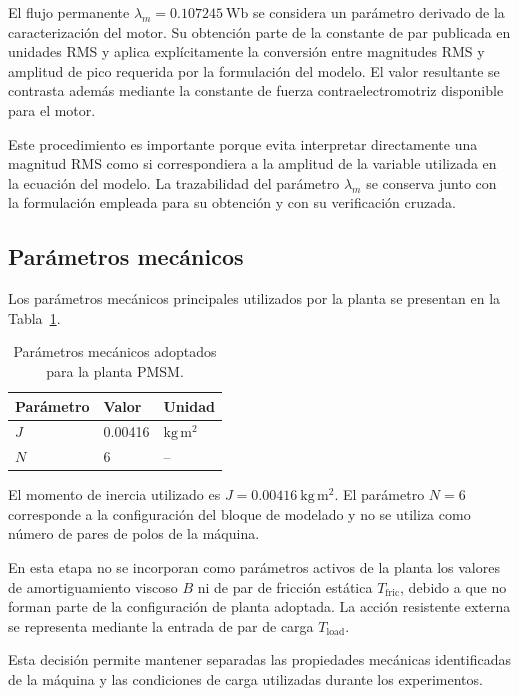 El flujo permanente $\lambda_m=0.107245~\mathrm{Wb}$ se considera un parámetro derivado de la caracterización del motor. Su obtención parte de la constante de par publicada en unidades RMS y aplica explícitamente la conversión entre magnitudes RMS y amplitud de pico requerida por la formulación del modelo. El valor resultante se contrasta además mediante la constante de fuerza contraelectromotriz disponible para el motor.

Este procedimiento es importante porque evita interpretar directamente una magnitud RMS como si correspondiera a la amplitud de la variable utilizada en la ecuación del modelo. La trazabilidad del parámetro $\lambda_m$ se conserva junto con la formulación empleada para su obtención y con su verificación cruzada.

\subsection{Parámetros mecánicos}

Los parámetros mecánicos principales utilizados por la planta se presentan en la Tabla~\ref{tab:parametros-mecanicos-m4}.

\begin{table}[H]
\centering
\caption{Parámetros mecánicos adoptados para la planta PMSM.}
\label{tab:parametros-mecanicos-m4}
\begin{tabular}{lll}
\toprule
Parámetro & Valor & Unidad \\
\midrule
$J$ & 0.00416 & $\mathrm{kg\,m^2}$ \\
$N$ & 6 & -- \\
\bottomrule
\end{tabular}
\end{table}

El momento de inercia utilizado es $J=0.00416~\mathrm{kg\,m^2}$. El parámetro $N=6$ corresponde a la configuración del bloque de modelado y no se utiliza como número de pares de polos de la máquina.

En esta etapa no se incorporan como parámetros activos de la planta los valores de amortiguamiento viscoso $B$ ni de par de fricción estática $T_{\mathrm{fric}}$, debido a que no forman parte de la configuración de planta adoptada. La acción resistente externa se representa mediante la entrada de par de carga $T_{\mathrm{load}}$.

Esta decisión permite mantener separadas las propiedades mecánicas identificadas de la máquina y las condiciones de carga utilizadas durante los experimentos.

